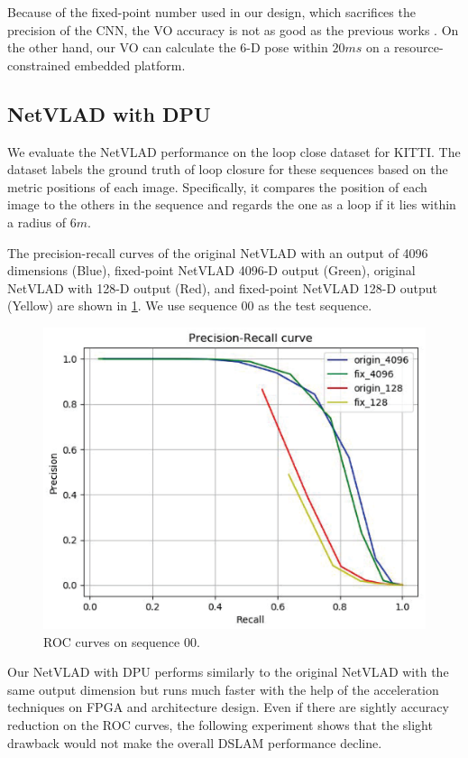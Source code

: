 Because of the fixed-point number used in our design, which sacrifices the precision of the CNN, the VO accuracy is not as good as the previous works \cite{Mur-Artal:2017281, Zhan:2018e92}. On the other hand, our VO can calculate the 6-D pose within $20ms$ on a resource-constrained embedded platform.

\subsection{NetVLAD with DPU}

We evaluate the NetVLAD performance on the loop close dataset for KITTI\cite{KITTIGroundTruth}.
The dataset labels the ground truth of loop closure for these sequences based on the metric positions of each image. Specifically, it compares the position of each image to the others in the sequence and regards the one as a loop if it lies within a radius of $6m$.

The precision-recall curves of the original NetVLAD with an output of 4096 dimensions (Blue), fixed-point NetVLAD 4096-D output (Green), original NetVLAD with 128-D output (Red), and fixed-point NetVLAD 128-D output (Yellow) are shown in \cref{fig:reloc}. We use sequence 00 as the test sequence.


\begin{figure}[t]
  \centering  
  \includegraphics[width=0.75\linewidth]{fig/val_reloc.eps}
  \caption{ROC curves on sequence 00.}
  \label{fig:reloc}
\end{figure}

Our NetVLAD with DPU performs similarly to the original NetVLAD with the same output dimension but runs much faster with the help of the acceleration techniques on FPGA and architecture design. Even if there are sightly accuracy reduction on the ROC curves, the following experiment shows that the slight drawback would not make the overall DSLAM performance decline.

